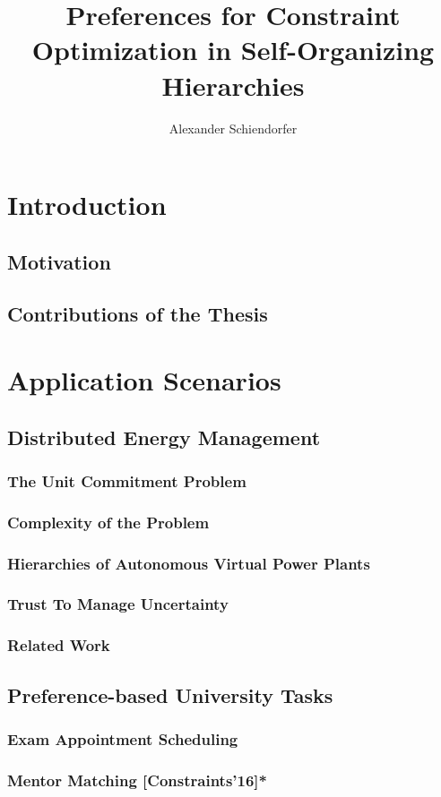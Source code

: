 \documentclass[10pt,a4paper]{book}
\author{Alexander Schiendorfer}
\title{Preferences for Constraint Optimization in Self-Organizing Hierarchies}
\begin{document}
\tableofcontents
\newpage
\chapter{Introduction}
\section{Motivation}
\section{Contributions of the Thesis}

\chapter{Application Scenarios}
\section{Distributed Energy Management}
\subsection{The Unit Commitment Problem}
\subsection{Complexity of the Problem}
\subsection{Hierarchies of Autonomous Virtual Power Plants}
\subsection{Trust To Manage Uncertainty}
\subsection{Related Work}

\section{Preference-based University Tasks}
\subsection{Exam Appointment Scheduling}
\subsection{Mentor Matching [Constraints'16]*}
\end{document}
